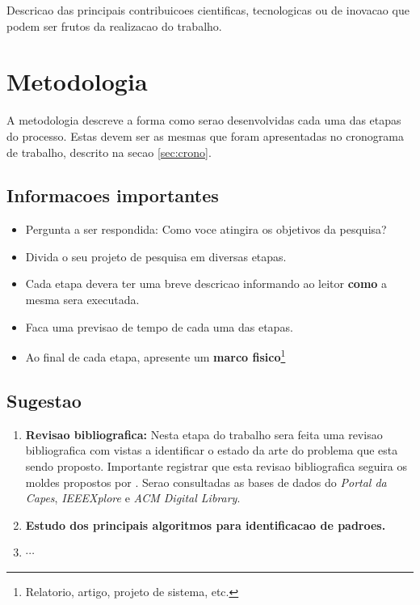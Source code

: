 \documentclass[a4paper,11pt]{article}
\begin{document}
Descricao das principais contribuicoes cientificas, tecnologicas ou de inovacao que podem ser frutos da realizacao do trabalho.

\section{Metodologia}

A metodologia descreve a forma como serao desenvolvidas cada uma das etapas do processo. Estas devem ser as mesmas que foram apresentadas no cronograma de trabalho, descrito na secao \ref{sec:crono}.

\subsection{Informacoes importantes}
\begin{itemize}
\item{Pergunta a ser respondida: Como voce atingira os objetivos da pesquisa?}
\item{Divida o seu projeto de pesquisa em diversas etapas.}
\item{Cada etapa devera ter uma breve descricao informando ao leitor \textbf{como} a mesma sera executada.}
\item{Faca uma previsao de tempo de cada uma das etapas.}
\item{Ao final de cada etapa, apresente um \textbf{marco fisico}\footnote{Relatorio, artigo, projeto de sistema, etc.}}
\end{itemize}

\subsection{Sugestao}
\begin{enumerate}[D1.]
\item{\textbf{Revisao bibliografica:} Nesta etapa do trabalho sera feita uma revisao bibliografica com vistas a identificar o estado da arte do problema que esta sendo proposto. Importante registrar que esta revisao bibliografica seguira os moldes propostos por \cite{Kitchenham2004}}. Serao consultadas as bases de dados do \emph{Portal da Capes}, \emph{IEEEXplore} e \emph{ACM Digital Library}.

\item{\textbf{Estudo dos principais algoritmos para identificacao de padroes.}}
\item{$\cdots$}
\end{enumerate}
\end{document}
